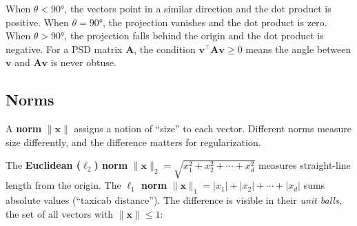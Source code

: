 \documentclass[main.tex]{subfiles}
\begin{document}
When $\theta < 90°$, the vectors point in a similar direction and the dot product is positive. When $\theta = 90°$, the projection vanishes and the dot product is zero. When $\theta > 90°$, the projection falls behind the origin and the dot product is negative. For a PSD matrix $\mathbf{A}$, the condition $\mathbf{v}^\top\mathbf{A}\mathbf{v} \geq 0$ means the angle between $\mathbf{v}$ and $\mathbf{A}\mathbf{v}$ is never obtuse.

\subsection{Norms}

A \textbf{norm} $\|\mathbf{x}\|$ assigns a notion of ``size'' to each vector. Different norms measure size differently, and the difference matters for regularization.

The \textbf{Euclidean ($\ell_2$) norm} $\|\mathbf{x}\|_2 = \sqrt{x_1^2 + x_2^2 + \cdots + x_d^2}$ measures straight-line length from the origin. The \textbf{$\ell_1$ norm} $\|\mathbf{x}\|_1 = |x_1| + |x_2| + \cdots + |x_d|$ sums absolute values (``taxicab distance''). The difference is visible in their \textit{unit balls}, the set of all vectors with $\|\mathbf{x}\| \leq 1$:

\begin{center}
\end{center}
\end{document}
